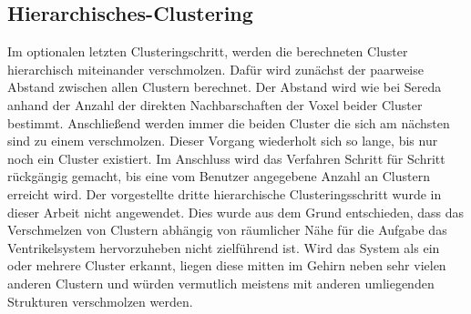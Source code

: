 \subsection{Hierarchisches-Clustering}
 
Im optionalen letzten Clusteringschritt, werden die berechneten Cluster hierarchisch miteinander verschmolzen. Dafür wird zunächst der paarweise Abstand zwischen allen Clustern berechnet. Der Abstand wird wie bei Sereda \cite{sereda2006automating} anhand der Anzahl der direkten Nachbarschaften der Voxel beider Cluster bestimmt. Anschließend werden immer die beiden Cluster die sich am nächsten sind zu einem verschmolzen. Dieser Vorgang wiederholt sich so lange, bis nur noch ein Cluster existiert. Im Anschluss wird das Verfahren Schritt für Schritt rückgängig gemacht, bis eine vom Benutzer angegebene Anzahl an Clustern erreicht wird.
\newline
Der vorgestellte dritte hierarchische Clusteringsschritt wurde in dieser Arbeit nicht angewendet. Dies wurde aus dem Grund entschieden, dass das Verschmelzen von Clustern abhängig von räumlicher Nähe für die Aufgabe das Ventrikelsystem hervorzuheben nicht zielführend ist. Wird das System als ein oder mehrere Cluster erkannt, liegen diese mitten im Gehirn neben sehr vielen anderen Clustern und würden vermutlich meistens mit anderen umliegenden Strukturen verschmolzen werden.

